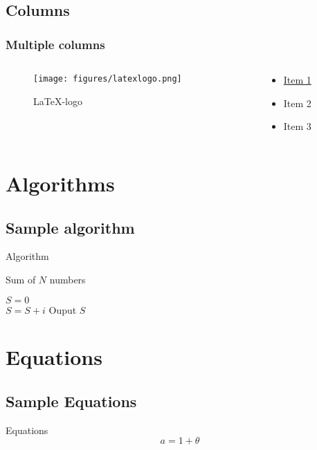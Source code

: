 \documentclass[aspectratio=169]{beamer}
\begin{document}
\subsection{Columns}
\begin{frame}
	\frametitle{Multiple columns}
	\begin{columns}
		\begin{column}{0.5\paperwidth}
		 \begin{figure}
			\centering
			\texttt{[image: figures/latexlogo.png]}
			\caption{\LaTeX-logo}
			\end{figure}
		\end{column}
		\begin{column}{0.5\paperwidth}
		 \begin{itemize}
			\item \hyperlink{label1}{Item 1} %
			\item Item 2
			\item Item 3
		 \end{itemize}
		\end{column}	
	\end{columns}
\end{frame}

\section{Algorithms}
\subsection{Sample algorithm}
\begin{frame}[label =label1]{Algorithm} %
	\begin{algorithm}[H]
		\caption{Sum of $N$ numbers}
		$S = 0$\\
		{
			$S = S + i$
		}
		Ouput $S$
	\end{algorithm}
\end{frame}

\section{Equations}
\subsection{Sample Equations}
\begin{frame}[label=eqn]{Equations}
	\begin{equation}
		a=1+\theta
	\end{equation}
\end{frame}
\end{document}
